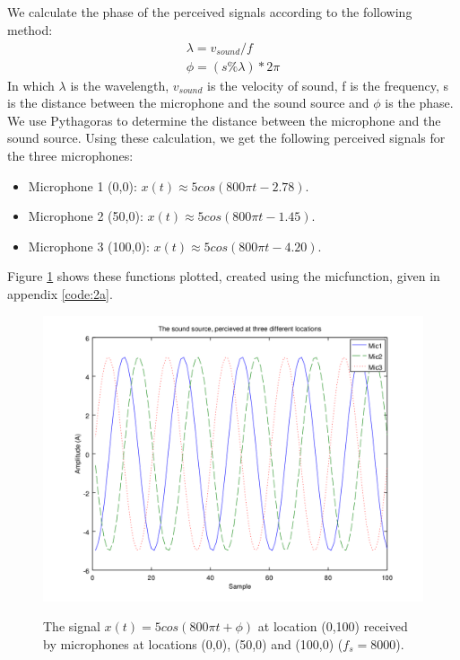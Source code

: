 \documentclass{article}
\begin{document}
\subsection{}
We calculate the phase of the perceived signals according to the following method:
\begin{align}
 \lambda = v_{sound} / f \\
 \phi = (s \% \lambda) * 2\pi
\end{align}
In which $\lambda$ is the wavelength, $v_{sound}$ is the velocity of sound, f is the frequency, s is the distance between the 
microphone and the sound source and $\phi$ is the phase. We use Pythagoras to determine the distance between the microphone
and the sound source. Using these calculation, we get the following perceived signals for the three microphones:
\begin{itemize}
 \item Microphone 1 (0,0): $x(t) \approx 5cos(800 \pi t - 2.78)$.
 \item Microphone 2 (50,0): $x(t) \approx 5cos(800 \pi t - 1.45)$.
 \item Microphone 3 (100,0): $x(t) \approx 5cos(800 \pi t - 4.20)$.
\end{itemize}
Figure \ref{fig2d} shows these functions plotted, created using the micfunction, given in appendix \autoref{code:2a}.
\begin{figure}[H]
  \centering
  \includegraphics[width=0.7\columnwidth]{plot2D.png}\\
  \caption{The signal $x(t) = 5cos(800 \pi t + \phi)$ at location (0,100) received by microphones at locations (0,0), (50,0) and (100,0) ($f_s = 8000$).}
  \label{fig2d}
\end{figure}
\end{document}
